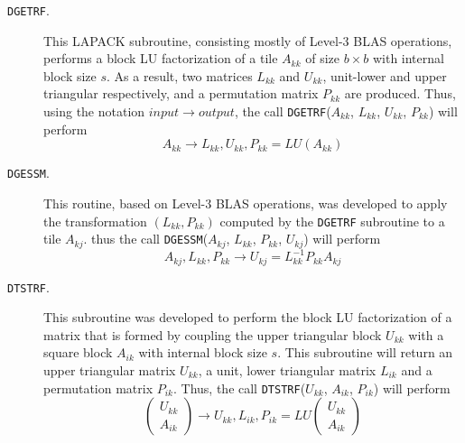 \documentclass{article}
\begin{document}
\begin{description}
\item[\texttt{DGETRF}.] This LAPACK subroutine, consisting mostly of
  Level-3 BLAS operations, performs a block LU
  factorization of a tile $A_{kk}$ of size $b \times b$ with internal block
  size $s$. As a result, two matrices $L_{kk}$ and $U_{kk}$, unit-lower and
  upper triangular respectively, and a permutation matrix $P_{kk}$ are
  produced. Thus, using the notation $input \longrightarrow output$,
  the call \texttt{DGETRF}($A_{kk}$, $L_{kk}$, $U_{kk}$, $P_{kk}$) will perform 
  \begin{displaymath}
    A_{kk} \longrightarrow L_{kk},U_{kk}, P_{kk} = LU(A_{kk})
  \end{displaymath}
\item[\texttt{DGESSM}.] This routine, based on Level-3 BLAS
  operations, was developed to apply the transformation
  $(L_{kk},P_{kk})$ computed by the \texttt{DGETRF} subroutine to a
  tile $A_{kj}$. thus the call \texttt{DGESSM}($A_{kj}$, $L_{kk}$,
  $P_{kk}$, $U_{kj}$) will perform
  \begin{displaymath}
    A_{kj}, L_{kk}, P_{kk} \longrightarrow U_{kj}=L_{kk}^{-1}P_{kk}A_{kj}
  \end{displaymath}
\item[\texttt{DTSTRF}.] This subroutine was developed to perform the
  block LU factorization of a matrix that is formed by coupling the
  upper triangular block $U_{kk}$ with a square block $A_{ik}$ with
  internal block size $s$. This subroutine will return an upper
  triangular matrix $U_{kk}$,
  a unit, lower triangular matrix $L_{ik}$ and a permutation matrix
  $P_{ik}$. Thus, the call \texttt{DTSTRF}($U_{kk}$, $A_{ik}$, $P_{ik}$) will perform
  \begin{displaymath}
    \left(
      \begin{array}{c}
        U_{kk}\\
        A_{ik}
      \end{array}\right) \longrightarrow U_{kk}, L_{ik}, P_{ik}
    = LU \left(
      \begin{array}{c}
        U_{kk}\\
        A_{ik}
      \end{array}\right)
  \end{displaymath}



\end{description}
\end{document}
